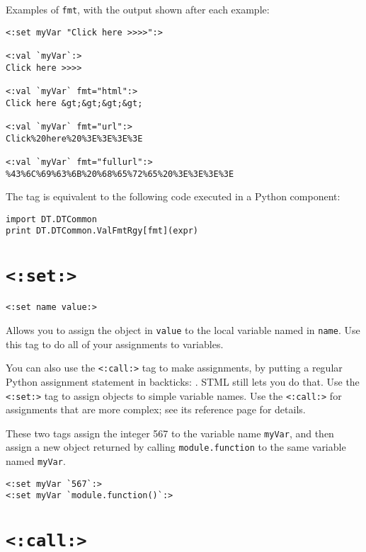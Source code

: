 \documentclass{manual}
\begin{document}
Examples of \texttt{fmt}, with the output shown after each example:

\begin{verbatim}
<:set myVar "Click here >>>>":>

<:val `myVar`:>
Click here >>>>

<:val `myVar` fmt="html":>
Click here &gt;&gt;&gt;&gt;

<:val `myVar` fmt="url":>
Click%20here%20%3E%3E%3E%3E

<:val `myVar` fmt="fullurl":>
%43%6C%69%63%6B%20%68%65%72%65%20%3E%3E%3E%3E
\end{verbatim}


The  tag is equivalent to the following code executed
in a Python component:

\begin{verbatim}
import DT.DTCommon
print DT.DTCommon.ValFmtRgy[fmt](expr)
\end{verbatim}


\section{\texttt{<:set:>}}
\label{tagset}

\begin{verbatim}
<:set name value:>
\end{verbatim}

Allows you to assign the object in \texttt{value} to the
local variable named in \texttt{name}. Use this tag to do
all of your assignments to variables.

You can also use the
\texttt{<:call:>}  tag to
make assignments, by putting a regular Python assignment
statement in backticks: .
STML still lets you do that. Use the \texttt{<:set:>} tag
to assign objects to simple variable names. Use the 
\texttt{<:call:>} for assignments that are more complex;
see its reference page for details.

These two tags assign the integer 567 to the variable name \texttt{myVar},
and then assign a new object returned by calling \texttt{module.function}
to the same variable named \texttt{myVar}.

\begin{verbatim}
<:set myVar `567`:>
<:set myVar `module.function()`:>
\end{verbatim}




\section{\texttt{<:call:>}}
\label{tagcall}
\end{document}
